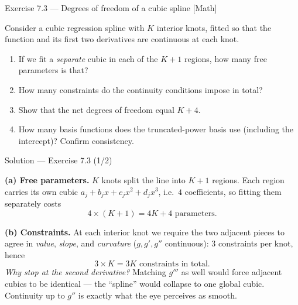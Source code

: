 \documentclass[aspectratio=169,11pt]{beamer}
\begin{document}
\begin{frame}{Exercise 7.3 --- Degrees of freedom of a cubic spline [Math]}
\begin{exercise}
Consider a cubic regression spline with $K$ interior knots, fitted so that the function and its first two derivatives are continuous at each knot.
\begin{enumerate}
  \item If we fit a \emph{separate} cubic in each of the $K+1$ regions, how many free parameters is that?
  \item How many constraints do the continuity conditions impose in total?
  \item Show that the net degrees of freedom equal $K+4$.
  \item How many basis functions does the truncated-power basis use (including the intercept)? Confirm consistency.
\end{enumerate}
\end{exercise}
\end{frame}

\begin{frame}{Solution --- Exercise 7.3 (1/2)}
\begin{solutionbox}
\textbf{(a) Free parameters.} $K$ knots split the line into $K+1$ regions. Each region carries its own cubic $a_j+b_jx+c_jx^2+d_jx^3$, i.e.\ $4$ coefficients, so fitting them separately costs
\[ 4\times(K+1)=4K+4 \text{ parameters.} \]

\medskip
\textbf{(b) Constraints.} At each interior knot we require the two adjacent pieces to agree in \emph{value}, \emph{slope}, and \emph{curvature} ($g,g',g''$ continuous): $3$ constraints per knot, hence
\[ 3\times K = 3K \text{ constraints in total.} \]
\emph{Why stop at the second derivative?} Matching $g'''$ as well would force adjacent cubics to be identical --- the ``spline'' would collapse to one global cubic. Continuity up to $g''$ is exactly what the eye perceives as smooth.
\end{solutionbox}
\end{frame}
\end{document}

